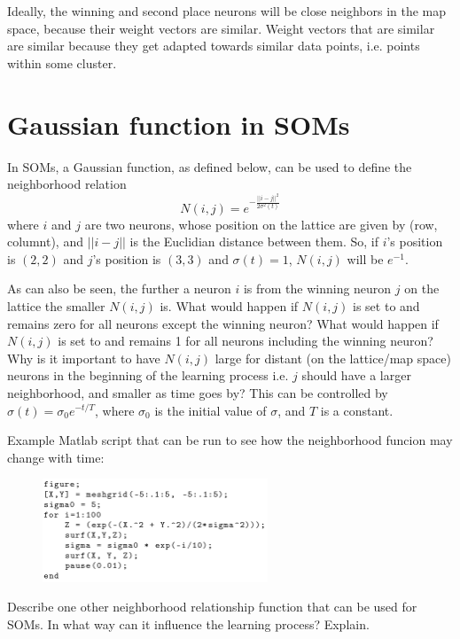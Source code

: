 Ideally, the winning and second place neurons will be close neighbors in the map space, because their weight vectors are similar.
Weight vectors that are similar are similar because they get adapted towards similar data points, i.e. points within some cluster.

\section{Gaussian function in SOMs}
In SOMs, a Gaussian function, as defined below, can be used to define the neighborhood relation
\begin{equation}
N(i,j) = e^{-\frac{||i-j||^2}{2\sigma^2(t)}}
\end{equation}
where \(i\) and \(j\) are two neurons, whose position on the lattice are given by (row, columnt), and \(||i-j||\) is the Euclidian distance between them. So, if \(i\)'s position is \((2,2)\) and \(j\)'s position is \((3,3)\) and \(\sigma(t) = 1\), \(N(i,j)\) will be \(e^{-1}\).

As can also be seen, the further a neuron \(i\) is from the winning neuron \(j\) on the lattice the smaller \(N(i,j)\) is. What would happen if \(N(i,j)\) is set to and remains zero for all neurons except the winning neuron? What would happen if \(N(i,j)\) is set to and remains 1 for all neurons including the winning neuron? Why is it important to have \(N(i,j)\) large for distant (on the lattice/map space) neurons in the beginning of the learning process i.e. \(j\) should have a larger neighborhood, and smaller as time goes by? This can be controlled by \(\sigma(t)=\sigma_0e^{-t/T}\), where \(\sigma_0\) is the initial value of \(\sigma\), and \(T\) is a constant.

Example Matlab script that can be run to see how the neighborhood funcion may change with time:
\begin{figure}[H]
\begin{center}
\includegraphics[width=0.6\textwidth]{matlab_example.png}
\end{center}
\end{figure}

Describe one other neighborhood relationship function that can be used for SOMs. In what way can it influence the learning process? Explain.\\

